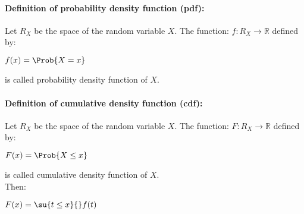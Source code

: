 \paragraph{Definition of probability density function (pdf):}
Let $R_{X}$ be the space of the random variable $X$. The function:
$f:R_{X}\rightarrow \mathbb{R}$ defined by:
\begin{center}
	$f(x)=\Prob{X=x}$
\end{center}
is called probability density function of $X$.
\paragraph{Definition of cumulative density function (cdf):}
Let $R_{X}$ be the space of the random variable $X$. The function:
$F:R_{X}\rightarrow \mathbb{R}$ defined by:\\
\begin{center}
	$F(x)=\Prob{X\leq x}$
\end{center}
is called cumulative density function of $X$.\\Then:
\begin{center}
	$F(x)=\su{t\leq x}{{}}f(t)$
\end{center}
